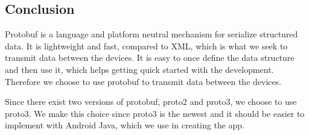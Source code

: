 \subsection{Conclusion}
Protobuf is a language and platform neutral mechanism for serialize structured data.
It is lightweight and fast, compared to XML, which is what we seek to transmit data between the devices.
It is easy to once define the data structure and then use it, which helps getting quick started with the development.
Therefore we choose to use protobuf to transmit data between the devices.

Since there exist two versions of protobuf, proto2 and proto3, we choose to use proto3.
We make this choice since proto3 is the newest and it should be easier to implement with Android Java, which we use in creating the app.

